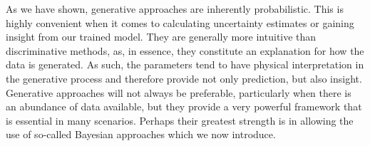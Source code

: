 As we have shown, generative approaches are inherently probabilistic.  This is highly convenient
when it comes to calculating uncertainty estimates or gaining insight from our trained model.
They are generally more intuitive than discriminative methods, as, in essence, they constitute an explanation for how the data is
generated.  As such, the parameters tend to have physical interpretation in the generative process and
therefore provide not only prediction, but also insight.  Generative approaches will not always be preferable,
particularly when there is an abundance of data available, but they provide a very powerful framework
that is essential in many scenarios.  Perhaps their greatest strength is in allowing the use of so-called
Bayesian approaches which we now introduce.